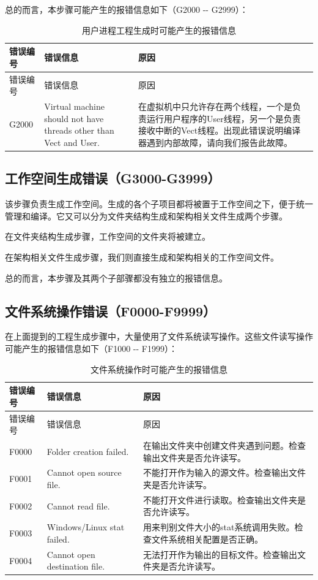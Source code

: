 总的而言，本步骤可能产生的报错信息如下（G2000 -\/- G2999）：

\begin{xltabular}{\textwidth}{@{}>{\hsize\raggedright\arraybackslash}X>{\hsize\raggedright\arraybackslash}X>{\hsize\raggedright\arraybackslash}X@{}}
\caption{用户进程工程生成时可能产生的报错信息}\label{tab:5-28}\\
\toprule
错误编号 & 错误信息 & 原因\tabularnewline
\endfirsthead
\toprule
错误编号 & 错误信息 & 原因\tabularnewline
\midrule
\endhead
\bottomrule
\endlastfoot
G2000 & Virtual machine should not have threads other than Vect and
User. &
在虚拟机中只允许存在两个线程，一个是负责运行用户程序的User线程，另一个是负责接收中断的Vect线程。出现此错误说明编译器遇到内部故障，请向我们报告此故障。\tabularnewline
\end{xltabular}

\subsection{工作空间生成错误（G3000-G3999）}\label{subsec:5-6-10}

该步骤负责生成工作空间。生成的各个子项目都将被置于工作空间之下，便于统一管理和编译。它又可以分为文件夹结构生成和架构相关文件生成两个步骤。

在文件夹结构生成步骤，工作空间的文件夹将被建立。

在架构相关文件生成步骤，我们则直接生成和架构相关的工作空间文件。

总的而言，本步骤及其两个子部骤都没有独立的报错信息。

\subsection{文件系统操作错误（F0000-F9999）}\label{subsec:5-6-11}

在上面提到的工程生成步骤中，大量使用了文件系统读写操作。这些文件读写操作可能产生的报错信息如下（F1000
-\/- F1999）：

\begin{xltabular}{\textwidth}{@{}>{\hsize\raggedright\arraybackslash}X>{\hsize\raggedright\arraybackslash}X>{\hsize\raggedright\arraybackslash}X@{}}
\caption{文件系统操作时可能产生的报错信息}\label{tab:5-29}\\
\toprule
错误编号 & 错误信息 & 原因\tabularnewline
\endfirsthead
\toprule
错误编号 & 错误信息 & 原因\tabularnewline
\midrule
\endhead
\bottomrule
\endlastfoot
F0000 & Folder creation failed. &
在输出文件夹中创建文件夹遇到问题。检查输出文件夹是否允许读写。\tabularnewline
F0001 & Cannot open source file. &
不能打开作为输入的源文件。检查输出文件夹是否允许读写。\tabularnewline
F0002 & Cannot read file. &
不能打开文件进行读取。检查输出文件夹是否允许读写。\tabularnewline
F0003 & Windows/Linux stat failed. &
用来判别文件大小的stat系统调用失败。检查文件系统相关配置是否正确。\tabularnewline
F0004 & Cannot open destination file. &
无法打开作为输出的目标文件。检查输出文件夹是否允许读写。\tabularnewline
\end{xltabular}

